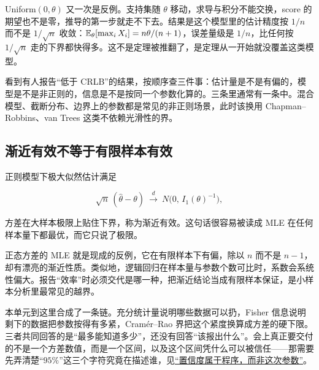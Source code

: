 Uniform\((0,\theta)\) 又一次是反例。支持集随 \(\theta\) 移动，求导与积分不能交换，score 的期望也不是零，推导的第一步就走不下去。结果是这个模型里的估计精度按 \(1/n\) 而不是 \(1/\sqrt n\) 收敛：\(\mathbb{E}_\theta[\max_i X_i]=n\theta/(n+1)\)，误差量级是 \(1/n\)，比任何按 \(1/\sqrt n\) 走的下界都快得多。这不是定理被推翻了，是定理从一开始就没覆盖这类模型。

看到有人报告``低于 CRLB''的结果，按顺序查三件事：估计量是不是有偏的，模型是不是非正则的，信息是不是按同一个参数化算的。三条里通常有一条中。混合模型、截断分布、边界上的参数都是常见的非正则场景，此时该换用 Chapman--Robbins、van Trees 这类不依赖光滑性的界。

\subsection{渐近有效不等于有限样本有效}

正则模型下极大似然估计满足

\[
\sqrt n\,(\hat\theta-\theta)\ \overset{d}{\longrightarrow}\ N\bigl(0,\,I_1(\theta)^{-1}\bigr),
\]

方差在大样本极限上贴住下界，称为渐近有效。这句话很容易被读成 MLE 在任何样本量下都最优，而它只说了极限。

正态方差的 MLE 就是现成的反例，它在有限样本下有偏，除以 \(n\) 而不是 \(n-1\)，却有漂亮的渐近性质。类似地，逻辑回归在样本量与参数个数可比时，系数会系统性偏大。报告``效率''时必须交代是哪一种，把渐近结论当成有限样本保证，是小样本分析里最常见的越界。

本单元到这里合成了一条链。充分统计量说明哪些数据可以扔，Fisher 信息说明剩下的数据把参数按得有多紧，Cramér--Rao 界把这个紧度换算成方差的硬下限。三者共同回答的是``最多能知道多少''，还没有回答``该报出什么''。会上真正要交付的不是一个方差数值，而是一个区间，以及这个区间凭什么可以被信任——那需要先弄清楚``\(95\%\)''这三个字符究竟在描述谁，见\hyperref[sec:11-Mathematical-Statistics/04-Interval-Estimation/01]{``置信度属于程序，而非这次参数''}。
